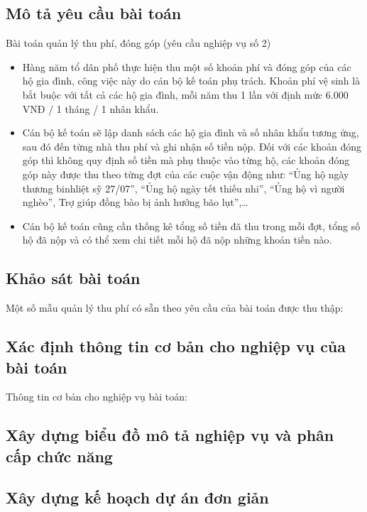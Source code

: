 \documentclass{article}
\begin{document}
\subsection{Mô tả yêu cầu bài toán}
Bài toán quản lý thu phí, đóng góp (yêu cầu nghiệp vụ số 2)
\begin{itemize}[leftmargin = 1.5cm]
    \item Hàng năm tổ dân phố thực hiện thu một số khoản phí và đóng góp của các hộ gia đình, công việc này do cán bộ kế toán phụ trách. Khoản phí vệ sinh là bắt buộc với tất cả các hộ gia đình, mỗi năm thu 1 lần với định mức 6.000 VNĐ / 1 tháng / 1 nhân khẩu.
    \item Cán bộ kế toán sẽ lập danh sách các hộ gia đình và số nhân khẩu tương ứng, sau đó đến từng nhà thu phí và ghi nhận số tiền nộp. Đối với các khoản đóng góp thì không quy định số tiền mà phụ thuộc vào từng hộ, các khoản đóng góp này được thu theo từng đợt của các cuộc vận động như: “Ủng hộ ngày thương binhliệt sỹ 27/07”, “Ủng hộ ngày tết thiếu nhi”, “Ủng hộ vì người nghèo”, Trợ giúp đồng bào bị ảnh hưởng bão lụt”,…
    \item Cán bộ kế toán cũng cần thống kê tổng số tiền đã thu trong mỗi đợt, tổng số hộ đã nộp và có thể xem chi tiết mỗi hộ đã nộp những khoản tiền nào.
\end{itemize}

\subsection{Khảo sát bài toán}
Một số mẫu quản lý thu phí có sẵn theo yêu cầu của bài toán được thu thập:

\subsection{Xác định thông tin cơ bản cho nghiệp vụ của bài toán}
Thông tin cơ bản cho nghiệp vụ bài toán:

\subsection{Xây dựng biểu đồ mô tả nghiệp vụ và phân cấp chức năng}

\subsection{Xây dựng kế hoạch dự án đơn giản}

\newpage

\end{document}
